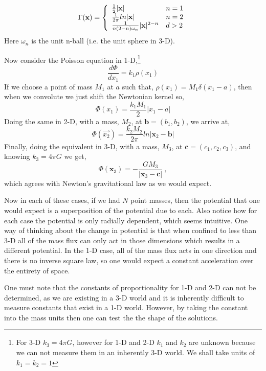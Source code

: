 \documentclass[10pt,a4paper]{article}
\begin{document}
\begin{equation}
  \Gamma(\textbf{x}) = \left\{ 
  \begin{array}{l l}
    \frac{1}{2}|\textbf{x}| & n=1\\
     \frac{1}{2\pi}ln|\textbf{x}| & n=2\\
    \frac{1}{n(2-n)\omega_n}|\textbf{x}|^{2-n} & d>2\\
  \end{array} \right.
\end{equation}
Here $\omega_n$ is the unit n-ball (i.e. the unit sphere in 3-D). 

Now consider the Poisson equation in 1-D,\footnote{For 3-D $k_3=4\pi G$, however for 1-D and 2-D $k_1$ and $k_2$ are unknown because we can not measure them in an inherently 3-D world. We shall take units of $k_1=k_2=1$}
\begin{equation}
\frac{d\Phi}{dx_1} = k_1\rho(x_1)
\end{equation}
If we choose a point of mass $M_1$ at $a$ such that, $\rho(x_1)=M_1\delta(x_1-a)$, then when we convolute we just shift the Newtonian kernel so,
\begin{equation}
\Phi(x_1)=\frac{k_1M_1}{2}|x_1-a|
\end{equation}
Doing the same in 2-D, with a mass, $M_2$, at $\textbf{b} = (b_1,b_2)$, we arrive at,
\begin{equation}
\Phi(\vec{x_2})=\frac{k_2M_2}{2\pi}ln|\textbf{x}_2-\textbf{b}|
\end{equation}
Finally, doing the equivalent in 3-D, with a mass, $M_3$, at $\textbf{c} = (c_1,c_2,c_3)$, and knowing $k_3=4\pi G$ we get,
\begin{equation}
\Phi(\textbf{x}_3)=-\frac{GM_3}{|\textbf{x}_3-\textbf{c}|}\:,
\end{equation}
which agrees with Newton's gravitational law as we would expect.

Now in each of these cases, if we had $N$ point masses, then the potential that one would expect is a superposition of the potential due to each. Also notice how for each case the potential is only radially dependent, which seems intuitive. One way of thinking about the change in potential is that when confined to less than 3-D all of the mass flux can only act in those dimensions which results in a different potential. In the 1-D case, all of the mass flux acts in one direction and there is no inverse square law, so one would expect a constant acceleration over the entirety of space. 

One must note that the constants of proportionality for 1-D and 2-D can not be determined, as we are existing in a 3-D world and it is inherently difficult to measure constants that exist in a 1-D world. However, by taking the constant into the mass units then one can test the the shape of the solutions.
 \newpage
\end{document}
